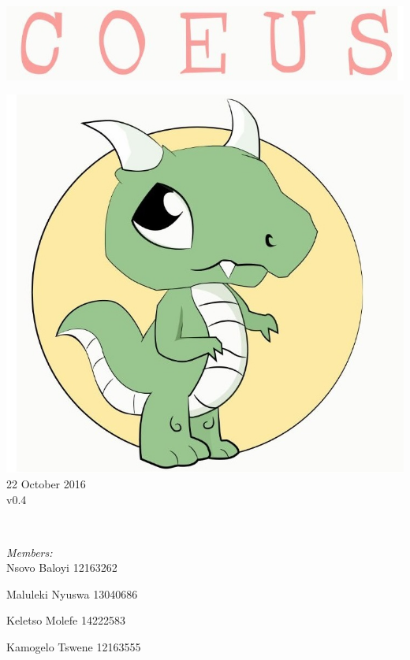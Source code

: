 \documentclass[a4paper,12pt]{article}
\begin{document}
\begin{titlepage}
	\includegraphics[width=\textwidth]{name} \\[1cm]
	\begin{minipage}{0.4\textwidth}
	\begin{flushleft} \large
	\includegraphics[width=\textwidth]{logo} \\[0.5cm]
	{\large 22  October 2016}\\
	{\large v0.4}
	\end{flushleft}
	\end{minipage}
	~
	\begin{minipage}{0.5\textwidth}
	\begin{flushright} \large
	\emph{Members:}\\%
	Nsovo Baloyi 12163262

	Maluleki Nyuswa 13040686
	
	Keletso Molefe 14222583
	
	Kamogelo Tswene 12163555

	\end{flushright}
	\end{minipage}\\[4cm]
\end{titlepage}
\end{document}
